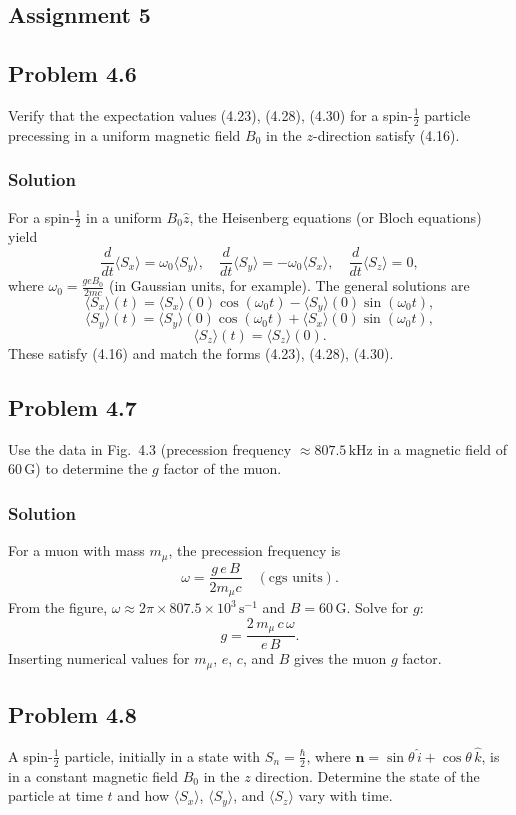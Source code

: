 \documentclass[twocolumn]{article}
\begin{document}
\begin{spacing}{1}
\section{Assignment 5}

\subsection{Problem 4.6}
Verify that the expectation values (4.23), (4.28), (4.30) for a spin-$\tfrac12$ particle precessing in a uniform magnetic field $B_0$ in the $z$-direction satisfy (4.16).

\subsubsection*{Solution}
For a spin-$\tfrac12$ in a uniform $B_0 \hat{z}$, the Heisenberg equations (or Bloch equations) yield
\[
\frac{d}{dt}\langle S_x\rangle = \omega_0 \langle S_y\rangle, 
\quad
\frac{d}{dt}\langle S_y\rangle = -\omega_0 \langle S_x\rangle, 
\quad
\frac{d}{dt}\langle S_z\rangle = 0,
\]
where $\omega_0 = \frac{g e B_0}{2 m c}$ (in Gaussian units, for example). The general solutions are
\[
\langle S_x\rangle(t) 
= \langle S_x\rangle(0)\cos(\omega_0 t) 
- \langle S_y\rangle(0)\sin(\omega_0 t),
\]
\[
\langle S_y\rangle(t) 
= \langle S_y\rangle(0)\cos(\omega_0 t) 
+ \langle S_x\rangle(0)\sin(\omega_0 t),
\]
\[
\langle S_z\rangle(t) = \langle S_z\rangle(0).
\]
These satisfy (4.16) and match the forms (4.23), (4.28), (4.30).

\subsection{Problem 4.7}
Use the data in Fig.~4.3 (precession frequency $\approx 807.5\,\text{kHz}$ in a magnetic field of $60\,\text{G}$) to determine the $g$ factor of the muon.

\subsubsection*{Solution}
For a muon with mass $m_\mu$, the precession frequency is 
\[
\omega = \frac{g\,e\,B}{2 m_\mu c}
\quad (\text{cgs units}).
\]
From the figure, $\omega \approx 2\pi \times 807.5\times 10^3\,\text{s}^{-1}$ and $B=60\,\text{G}$. Solve for $g$:
\[
g 
= \frac{2\,m_\mu\,c\,\omega}{e\,B}.
\]
Inserting numerical values for $m_\mu$, $e$, $c$, and $B$ gives the muon $g$ factor.

\subsection{Problem 4.8}
A spin-$\tfrac12$ particle, initially in a state with $S_n = \tfrac{\hbar}{2}$, where $\mathbf{n} = \sin\theta\,\hat{i} + \cos\theta\,\hat{k}$, is in a constant magnetic field $B_0$ in the $z$ direction. Determine the state of the particle at time $t$ and how $\langle S_x \rangle$, $\langle S_y \rangle$, and $\langle S_z \rangle$ vary with time.


\end{spacing}
\end{document}
